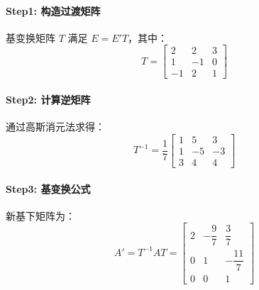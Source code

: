 \paragraph{Step1: 构造过渡矩阵}  
基变换矩阵 \(T\) 满足 \(E = E'T\)，其中：
\[
T = \begin{bmatrix}
2 & 2 & 3 \\
1 & -1 & 0 \\
-1 & 2 & 1
\end{bmatrix}
\]

\paragraph{Step2: 计算逆矩阵}  
通过高斯消元法求得：
\[
T^{-1} = \dfrac{1}{7} \begin{bmatrix}
1 & 5 & 3 \\
1 & -5 & -3 \\
3 & 4 & 4
\end{bmatrix}
\]

\paragraph{Step3: 基变换公式}  
新基下矩阵为：
\[
A' = T^{-1}AT = \begin{bmatrix}
2 & -\dfrac{9}{7} & \dfrac{3}{7} \\
0 & 1 & -\dfrac{11}{7} \\
0 & 0 & 1
\end{bmatrix}
\]